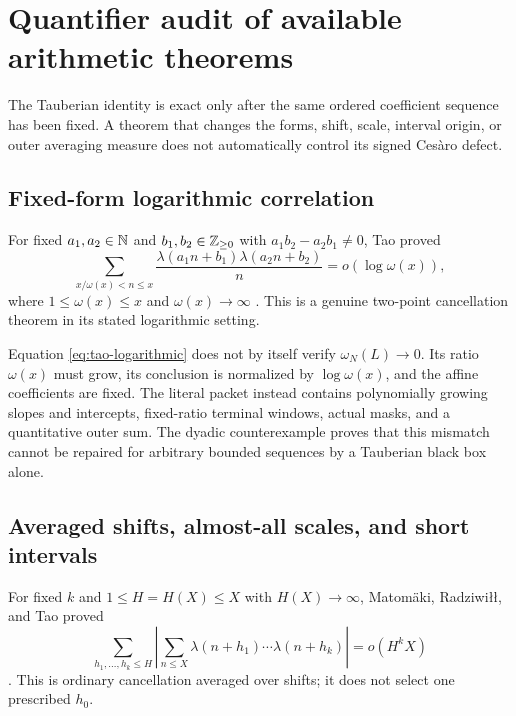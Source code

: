 \section{Quantifier audit of available arithmetic theorems}
\label{sec:literature-quantifiers}

The Tauberian identity is exact only after the same ordered
coefficient sequence has been fixed.  A theorem that changes the
forms, shift, scale, interval origin, or outer averaging measure does
not automatically control its signed Ces\`aro defect.

\subsection{Fixed-form logarithmic correlation}

For fixed \(a_1,a_2\in\mathbb N\) and
\(b_1,b_2\in\mathbb Z_{\ge0}\) with
\(a_1b_2-a_2b_1\ne0\), Tao proved
\begin{equation}
 \sum_{x/\omega(x)<n\le x}
 \frac{\lambda(a_1n+b_1)\lambda(a_2n+b_2)}n
 =o(\log\omega(x)),
\label{eq:tao-logarithmic}
\end{equation}
where \(1\le\omega(x)\le x\) and \(\omega(x)\to\infty\)
\citep{Tao2016LogChowla}.  This is a genuine two-point cancellation
theorem in its stated logarithmic setting.

Equation \eqref{eq:tao-logarithmic} does not by itself verify
\(\omega_N(L)\to0\).  Its ratio \(\omega(x)\) must grow, its
conclusion is normalized by \(\log\omega(x)\), and the affine
coefficients are fixed.  The literal packet instead contains
polynomially growing slopes and intercepts, fixed-ratio terminal
windows, actual masks, and a quantitative outer sum.  The dyadic
counterexample proves that this mismatch cannot be repaired for
arbitrary bounded sequences by a Tauberian black box alone.

\subsection{Averaged shifts, almost-all scales, and short intervals}

For fixed \(k\) and \(1\le H=H(X)\le X\) with \(H(X)\to\infty\),
Matom\"aki, Radziwi{\l}{\l}, and Tao proved
\begin{equation}
 \sum_{h_1,\ldots,h_k\le H}
 \left|
 \sum_{n\le X}\lambda(n+h_1)\cdots\lambda(n+h_k)
 \right|
 =o(H^kX)
\label{eq:mrt-averaged-shifts}
\end{equation}
\citep{MatomakiRadziwillTao2015}.  This is ordinary cancellation
averaged over shifts; it does not select one prescribed \(h_0\).

